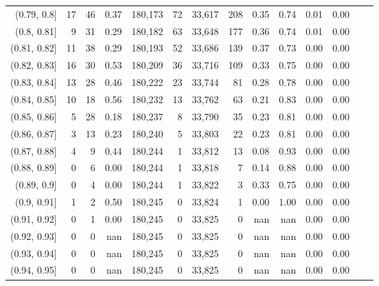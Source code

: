 \begin{tabular}{rrrrrrrrrrrrrr}
(0.79, 0.8]    &      17 &     46 &    0.37 &  180,173 &       72 &  33,617 &     208 &  0.35 &  0.74 &  0.01 &      0.00 \\
(0.8, 0.81]    &       9 &     31 &    0.29 &  180,182 &       63 &  33,648 &     177 &  0.36 &  0.74 &  0.01 &      0.00 \\
(0.81, 0.82]   &      11 &     38 &    0.29 &  180,193 &       52 &  33,686 &     139 &  0.37 &  0.73 &  0.00 &      0.00 \\
(0.82, 0.83]   &      16 &     30 &    0.53 &  180,209 &       36 &  33,716 &     109 &  0.33 &  0.75 &  0.00 &      0.00 \\
(0.83, 0.84]   &      13 &     28 &    0.46 &  180,222 &       23 &  33,744 &      81 &  0.28 &  0.78 &  0.00 &      0.00 \\
(0.84, 0.85]   &      10 &     18 &    0.56 &  180,232 &       13 &  33,762 &      63 &  0.21 &  0.83 &  0.00 &      0.00 \\
(0.85, 0.86]   &       5 &     28 &    0.18 &  180,237 &        8 &  33,790 &      35 &  0.23 &  0.81 &  0.00 &      0.00 \\
(0.86, 0.87]   &       3 &     13 &    0.23 &  180,240 &        5 &  33,803 &      22 &  0.23 &  0.81 &  0.00 &      0.00 \\
(0.87, 0.88]   &       4 &      9 &    0.44 &  180,244 &        1 &  33,812 &      13 &  0.08 &  0.93 &  0.00 &      0.00 \\
(0.88, 0.89]   &       0 &      6 &    0.00 &  180,244 &        1 &  33,818 &       7 &  0.14 &  0.88 &  0.00 &      0.00 \\
(0.89, 0.9]    &       0 &      4 &    0.00 &  180,244 &        1 &  33,822 &       3 &  0.33 &  0.75 &  0.00 &      0.00 \\
(0.9, 0.91]    &       1 &      2 &    0.50 &  180,245 &        0 &  33,824 &       1 &  0.00 &  1.00 &  0.00 &      0.00 \\
(0.91, 0.92]   &       0 &      1 &    0.00 &  180,245 &        0 &  33,825 &       0 &   nan &   nan &  0.00 &      0.00 \\
(0.92, 0.93]   &       0 &      0 &     nan &  180,245 &        0 &  33,825 &       0 &   nan &   nan &  0.00 &      0.00 \\
(0.93, 0.94]   &       0 &      0 &     nan &  180,245 &        0 &  33,825 &       0 &   nan &   nan &  0.00 &      0.00 \\
(0.94, 0.95]   &       0 &      0 &     nan &  180,245 &        0 &  33,825 &       0 &   nan &   nan &  0.00 &      0.00 \\

\end{tabular}
